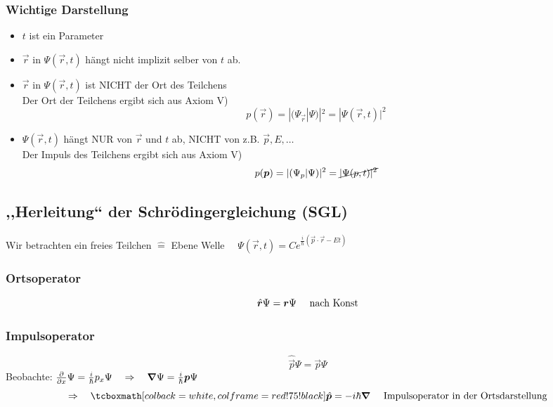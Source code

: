 \subsubsection{Wichtige Darstellung}

\begin{itemize}
	\item $t$ ist ein Parameter
	\item $\vec{r}$ in $\Psi(\vec{r},t)$ hängt nicht implizit selber von $t$ ab.
	\item $\vec{r}$ in $\Psi(\vec{r},t)$ ist \color{red} NICHT \color{black} der Ort des Teilchens \mau\\
	Der Ort der Teilchens ergibt sich aus Axiom V)
	$$p(\vec{r}) = |(\Psi_{\vec{r}}|\Psi)|^2 = |\Psi(\vec{r},t)|^2$$
	\item $\Psi(\vec{r},t)$ hängt \color{red} NUR \color{black} von $\vec{r}$ und $t$ ab, \color{red} NICHT \color{black} von z.B. $\vec{p}, E, \dots$\\
	Der Impuls des Teilchens ergibt sich aus Axiom V)
	$$p(\vec{p}) = |(\Psi_p | \Psi)|^2 = \cancel{| \Psi(p,t)|^2}$$
\end{itemize}

\subsection{,,Herleitung`` der Schrödingergleichung (SGL)}

Wir betrachten ein freies Teilchen $ \widehat{=} $ Ebene Welle $ \quad \Psi(\vec{r},t) = C e^{\frac{i}{\hbar} (\vec{p} \cdot \vec{r} - E t)} $

\subsubsection{Ortsoperator}

\begin{equation*}
\hat{\vec{r}} \Psi = \vec{r} \Psi \quad \tx{ nach Konst}
\end{equation*}

\subsubsection{Impulsoperator}

\begin{equation*}
\hat{\vec{p}} \Psi = \vec{p} \Psi
\end{equation*}
Beobachte: $ \prt{}{x} \Psi = \frac{i}{\hbar} p_x \Psi \quad \Rightarrow \quad \vabla \Psi = \frac{i}{\hbar} \vec{p} \Psi $
\begin{equation*}
\Rightarrow \quad \rmbox{\hat{\vec{p}} = - i \hbar \vabla} \quad \tx{ Impulsoperator in der Ortsdarstellung}
\end{equation*}

